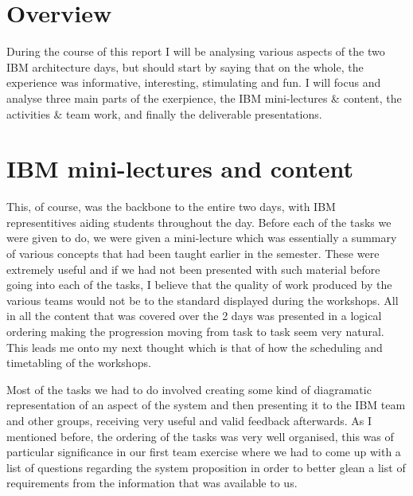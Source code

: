 \documentclass[12pt]{article} %
\begin{document}

\newpage
\tableofcontents %

\newpage
\section{Overview}

During the course of this report I will be analysing various aspects of the two IBM architecture days, but should start by saying that on the whole, the experience was informative, interesting, stimulating and fun. I will focus and analyse three main parts of the exerpience, the IBM mini-lectures \& content, the activities \& team work, and finally the deliverable presentations.

\section{IBM mini-lectures and content}
This, of course, was the backbone to the entire two days, with IBM representitives aiding students throughout the day. Before each of the tasks we were given to do, we were given a mini-lecture which was essentially a summary of various concepts that had been taught earlier in the semester. These were extremely useful and if we had not been presented with such material before going into each of the tasks, I believe that the quality of work produced by the various teams would not be to the standard displayed during the workshops. All in all the content that was covered over the 2 days was presented in a logical ordering making the progression moving from task to task seem very natural. This leads me onto my next thought which is that of how the scheduling and timetabling of the workshops. 

Most of the tasks we had to do involved creating some kind of diagramatic representation of an aspect of the system and then presenting it to the IBM team and other groups, receiving very useful and valid feedback afterwards. As I mentioned before, the ordering of the tasks was very well organised, this was of particular significance in our first team exercise where we had to come up with a list of questions regarding the system proposition in order to better glean a list of requirements from the information that was available to us.
\end{document}
